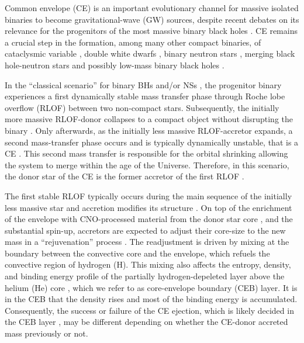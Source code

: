 \documentclass[twocolumn,twocolappendix,trackchanges]{aastex63}
\begin{document}
Common envelope (CE) is an important evolutionary channel for
massive isolated binaries to become gravitational-wave (GW) sources, despite
recent debates on its relevance for the progenitors of the most
massive binary black holes \citep[e.g.,][]{pavlovskii:2017,
  klencki:2020, klencki:2021, vanson:2021, marchant:2021}.
CE remains a crucial step in the
formation, among many other compact binaries, of cataclysmic variable
\citep{paczynski:1976}, double white dwarfs
\citep[e.g.,][]{zorotovic:2010, korol:2017, kremer:2017, renzo:21gwce,
  thiele:21}, binary neutron stars
\citep[NS, e.g.,][]{vigna-gomez:2018, vigna-gomez:2020}, merging black hole-neutron stars
\citep[e.g.,][]{kruckow:18, broekgaarden:21} and possibly low-mass binary black
holes \citep[BH, e.g.,][]{dominik:2012, vanson:2021}.

In the ``classical scenario'' for binary BHs and/or NSs
\citep[e.g.,][]{tutukov:93,belczynski:2016, tauris:2017}, the
progenitor binary %
experiences a first dynamically stable mass transfer
phase through Roche lobe overflow (RLOF) between two non-compact
stars. Subsequently, the initially more massive RLOF-donor collapses to a
compact object without disrupting the binary
\citep[e.g.,][]{blaauw:1961,renzo:2019walk}. Only afterwards, as the
initially less massive RLOF-accretor expands, a second mass-transfer phase
occurs and is typically dynamically unstable, that is a CE
\citep[e.g.,][]{dominik:2012, belczynski:2016, kruckow:18}. This
second mass transfer is responsible for the orbital shrinking
\citep{paczynski:1976} allowing the system to merge within the age of
the Universe. Therefore, in this scenario, the donor star of the CE is
the former accretor of the first RLOF \citep[e.g.,][]{klencki:2020,
  law-smith:2020, renzo:2021zoph}.

The first stable RLOF typically occurs during the main sequence of the
initially less massive star and accretion modifies its structure
\citep[e.g.,][]{neo:1977, packet:1981, blaauw:1993, cantiello:2007,
  renzo:2021zoph}. On top of the enrichment of the envelope with
CNO-processed material from the donor star core \citep{blaauw:1993,
  renzo:2021zoph, el-badry:2022a}, and the substantial spin-up,
accretors are expected to adjust their core-size to the new mass in a
``rejuvenation'' process \citep[e.g.,][]{neo:1977, hellings:1983,
  hellings:1984}. The readjustment is driven by mixing at the boundary
between the convective core and the envelope, which refuels the
convective region of hydrogen (H). This mixing also affects the entropy,
density, and binding energy profile of the partially
hydrogen-depeleted layer above the helium (He) core
\citep[][]{renzo:2021zoph}, which we refer to as core-envelope
boundary (CEB) layer. It is in the CEB that the density rises and most of the
binding energy is accumulated. Consequently, the success or failure of
the CE ejection, which is likely decided in the CEB layer
\citep[e.g.,][]{ivanova:2013}, may be different depending on whether
the CE-donor accreted mass previously or not.
\end{document}
